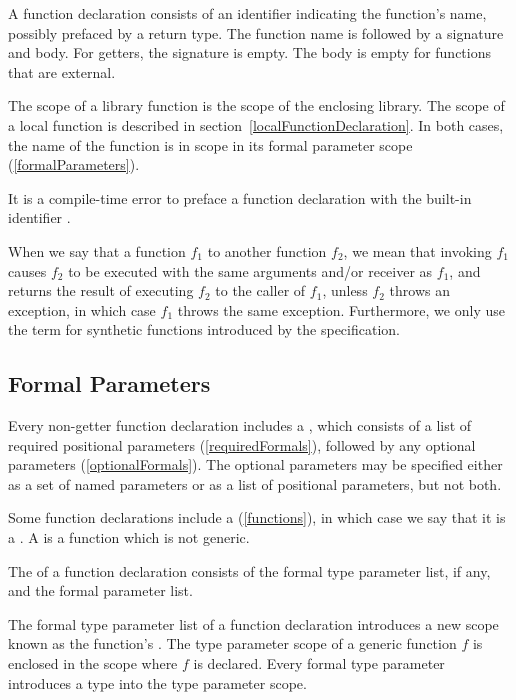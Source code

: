 \documentclass[makeidx]{article}
\begin{document}
\LMHash{}%
A function declaration consists of an identifier indicating the function's name,
possibly prefaced by a return type.
The function name is followed by a signature and body.
For getters, the signature is empty.
The body is empty for functions that are external.

\LMHash{}%
The scope of a library function is the scope of the enclosing library.
The scope of a local function is described
in section~\ref{localFunctionDeclaration}.
In both cases, the name of the function is in scope
in its formal parameter scope
(\ref{formalParameters}).

\LMHash{}%
It is a compile-time error to preface a function declaration
with the built-in identifier \STATIC.

\LMHash{}%
When we say that a function $f_1$  to another function $f_2$,
we mean that invoking $f_1$ causes $f_2$ to be executed
with the same arguments and/or receiver as $f_1$,
and returns the result of executing $f_2$ to the caller of $f_1$,
unless $f_2$ throws an exception,
in which case $f_1$ throws the same exception.
Furthermore, we only use the term for
synthetic functions introduced by the specification.


\subsection{Formal Parameters}

\LMHash{}%
Every non-getter function declaration includes a
,
which consists of a list of required positional parameters
(\ref{requiredFormals}),
followed by any optional parameters (\ref{optionalFormals}).
The optional parameters may be specified either as
a set of named parameters or as a list of positional parameters,
but not both.

\LMHash{}%
Some function declarations include a
 (\ref{functions}),
in which case we say that it is a
.
A 
is a function which is not generic.

\LMHash{}%
The  of a function declaration consists of
the formal type parameter list, if any, and the formal parameter list.


\LMHash{}%
The formal type parameter list of a function declaration introduces
a new scope known as the function's
.
The type parameter scope of a generic function $f$ is enclosed in
the scope where $f$ is declared.
Every formal type parameter introduces a type into the type parameter scope.
\end{document}
